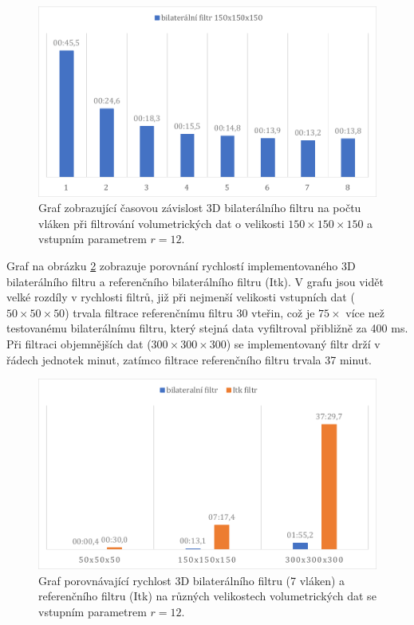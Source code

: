 \begin{figure} [H]
    \centering
    \label{fig:results:3dbl_threads}
    \includegraphics[width=1\textwidth]{figures/3dbl_threads.pdf}
    \caption{Graf zobrazující časovou závislost 3D bilaterálního filtru na počtu vláken při filtrování volumetrických dat o velikosti $150\times150\times150$ a vstupním parametrem $r=12$.}
\end{figure}

Graf na obrázku \ref{fig:results:3dbl} zobrazuje porovnání rychlostí implementovaného 3D bilaterálního filtru a referenčního bilaterálního filtru (Itk). V grafu jsou vidět velké rozdíly v rychlosti filtrů, již při nejmenší velikosti vstupních dat ($50\times50\times50$) trvala filtrace referenčnímu filtru 30 vteřin, což je $75\times$ více než testovanému bilaterálnímu filtru, který stejná data vyfiltroval přibližně za 400 ms. Při filtraci objemnějších dat ($300\times300\times300$) se implementovaný filtr drží v řádech jednotek minut, zatímco filtrace referenčního filtru trvala 37 minut. 

\begin{figure} [H]
    \centering
    \label{fig:results:3dbl}
    \includegraphics[width=1\textwidth]{figures/3dbl.pdf}
    \caption{Graf porovnávající rychlost 3D bilaterálního filtru (7 vláken) a referenčního filtru (Itk) na různých velikostech volumetrických dat se vstupním parametrem $r=12$.}
\end{figure}

